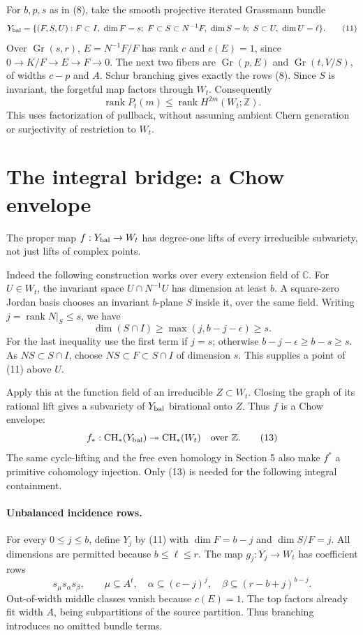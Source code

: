 \documentclass[11pt,letterpaper]{article}
\newcommand{\Z}{\mathbb Z}
\newcommand{\C}{\mathbb C}
\newcommand{\Gr}{\operatorname{Gr}}
\newcommand{\rank}{\operatorname{rank}}
\begin{document}
For \(b,p,s\) as in (8), take the smooth projective iterated
Grassmann bundle
\[
 Y_{\rm bal}=\{(F,S,U):
 F\subset I,\ \dim F=s;\
 F\subset S\subset N^{-1}F,\ \dim S=b;\
 S\subset U,\ \dim U=\ell\}.
 \tag{11}
\]
Over \(\Gr(s,r)\), \(E=N^{-1}F/F\) has rank \(c\) and
\(c(E)=1\), since \(0\to K/F\to E\to F\to0\).
The next two fibers are \(\Gr(p,E)\) and
\(\Gr(t,V/S)\), of widths \(c-p\) and \(A\).
Schur branching gives exactly the rows (8).
Since \(S\) is invariant, the forgetful map factors through \(W_t\).
Consequently
\[
 \rank P_t(m)\le\rank H^{2m}(W_t;\Z).
 \tag{12}
\]
This uses factorization of pullback, without assuming ambient Chern
generation or surjectivity of restriction to \(W_t\).

\newpage
\section{The integral bridge: a Chow envelope}
The proper map \(f:Y_{\rm bal}\to W_t\) has degree-one lifts of
every irreducible subvariety, not just lifts of complex points.

Indeed the following construction works over every extension field of
\(\C\). For \(U\in W_t\), the invariant space
\(U\cap N^{-1}U\) has dimension at least \(b\).
A square-zero Jordan basis chooses an invariant \(b\)-plane \(S\)
inside it, over the same field.
Writing \(j=\rank N|_S\le s\), we have
\[
 \dim(S\cap I)\ge\max(j,b-j-\epsilon)\ge s.
\]
For the last inequality use the first term if \(j=s\);
otherwise \(b-j-\epsilon\ge b-s\ge s\).
As \(NS\subset S\cap I\), choose \(NS\subset F\subset S\cap I\)
of dimension \(s\). This supplies a point of (11) above \(U\).

Apply this at the function field of an irreducible
\(Z\subset W_t\). Closing the graph of its rational lift gives a
subvariety of \(Y_{\rm bal}\) birational onto \(Z\).
Thus \(f\) is a Chow envelope:
\[
 f_*:\operatorname{CH}_*(Y_{\rm bal})
       \twoheadrightarrow\operatorname{CH}_*(W_t)
 \quad\hbox{over }\Z .
 \tag{13}
\]
The same cycle-lifting and the free even homology in Section 5 also make
\(f^*\) a primitive cohomology injection. Only (13) is needed for
the following integral containment.

\paragraph{Unbalanced incidence rows.}
For every \(0\le j\le b\), define \(Y_j\) by (11) with
\(\dim F=b-j\) and \(\dim S/F=j\).
All dimensions are permitted because \(b\le\ell\le r\).
The map \(g_j:Y_j\to W_t\) has coefficient rows
\[
 s_\mu s_\alpha s_\beta,\qquad
 \mu\subseteq A^t,\quad
 \alpha\subseteq(c-j)^j,\quad
 \beta\subseteq(r-b+j)^{b-j}.
 \tag{14}
\]
Out-of-width middle classes vanish because \(c(E)=1\).
The top factors already fit width \(A\), being subpartitions of the
source partition. Thus branching introduces no omitted bundle terms.
\end{document}
